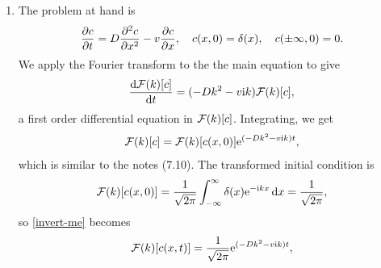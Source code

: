 \documentclass[a4paper, 12pt]{article}
\begin{document}
\begin{enumerate}[label={\bf \arabic{*}.\;}, ref={\arabic{*}},itemsep=3ex, left=0ex]
{\begin{enumerate}[label=(\roman*)]
        \item{The problem at hand is
            \begin{equation}
              \pd{c}{t} = D\pdd{c}{x} - v\pd{c}{x},\quad c(x,0) = \delta(x),\quad c(\pm\infty,0)= 0.
            \end{equation}
            We apply the Fourier transform to the the main equation to give
            \begin{equation}
              \fd{\Four(k)[c]}{t} =(-D k^2 -v\i {k}) \Four(k)[c],
            \end{equation}
            a first order differential equation in $\mathcal{F}(k)[c]$. Integrating, we get
            \begin{equation}\label{invert-me}
              \mathcal{F}(k)[c] = \mathcal{F}(k)[c(x,0)]\mathrm{e} ^{ (-D k^2 -v\mathrm{i} {k})t},
            \end{equation}
            which is similar to the notes (7.10). The transformed initial condition is
            \begin{equation}
              \mathcal{F}(k)[c(x,0)] = \frac{1}{\sqrt{2\pi}}\int_{-\infty}^\infty \delta(x) \mathrm{e}^{-\mathrm{i} kx}\,\mathrm{d}x = \frac{1}{\sqrt{2\pi}},
            \end{equation}
            so \cref{invert-me} becomes
            \begin{equation}
              \mathcal{F}(k)[c(x,t)] = \frac{1}{\sqrt{2\pi}} \mathrm{e} ^{ (-D k^2 -v\mathrm{i} {k})t},
            \end{equation}

}
\end{enumerate}}
\end{enumerate}
\end{document}
